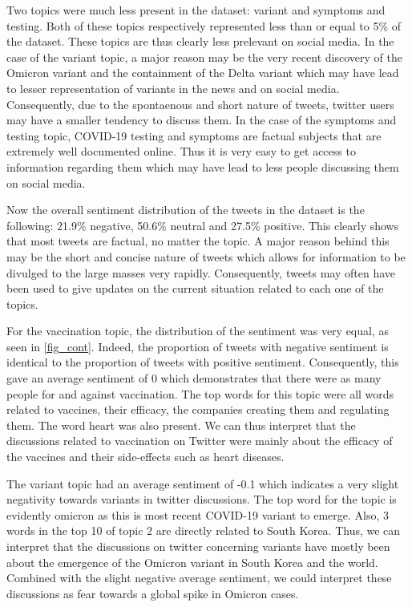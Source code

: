 \documentclass[letterpaper]{article} %
\begin{document}
Two topics were much less present in the dataset: variant and symptoms and testing. Both of these topics respectively represented less than or equal to 5\% of the dataset. These topics are thus clearly less prelevant on social media. In the case of the variant topic,  a major reason may be the very recent discovery of the Omicron variant and the containment of the Delta variant which may have lead to lesser representation of variants in the news and on social media. Consequently, due to the spontaenous and short nature of tweets, twitter users may have a smaller tendency to discuss them. In the case of the symptoms and testing topic, COVID-19 testing and symptoms are factual subjects that are extremely well documented online. Thus it is very easy to get access to information regarding them which may have lead to less people discussing them on social media.

Now the overall sentiment distribution of the tweets in the dataset is the following: 21.9\% negative, 50.6\% neutral and 27.5\% positive. This clearly shows that most tweets are factual, no matter the topic. A major reason behind this may be the short and concise nature of tweets which allows for information to be divulged to the large masses very rapidly. Consequently, tweets may often have been used to give updates on the current situation related to each one of the topics. 

For the vaccination topic, the distribution of the sentiment was very equal, as
seen in \ref{fig_cont}. Indeed, the proportion of tweets with negative sentiment is identical to the proportion of tweets with positive sentiment. Consequently, this gave an average sentiment of 0 which demonstrates that there were as many people for and against vaccination. The top words for this topic were all words related to vaccines, their efficacy, the companies creating them and regulating them. The word heart was also present. We can thus interpret that the discussions related to vaccination on Twitter were mainly about the efficacy of the vaccines and their side-effects such as heart diseases. 

The variant topic had an average sentiment of -0.1 which indicates a very slight negativity towards variants in twitter discussions. The top word for the topic is evidently omicron as this is most recent COVID-19 variant to emerge. Also, 3 words in the top 10 of topic 2 are directly related to South Korea. Thus, we can interpret that the discussions on twitter concerning variants have mostly been about the emergence of the Omicron variant in South Korea and the world. Combined with the slight negative average sentiment, we could interpret these discussions as fear towards a global spike in Omicron cases. 
\end{document}
